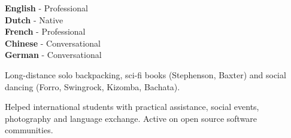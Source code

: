 \documentclass[9pt]{developercv} %
\begin{document}
\begin{minipage}[t]{0.3\textwidth}
	\vspace{-\baselineskip} %

	
	\textbf{English} - Professional\\
	\textbf{Dutch} - Native\\
	\textbf{French} - Professional\\
	\textbf{Chinese} - Conversational\\
	\textbf{German} - Conversational
\end{minipage}
\hfill
\begin{minipage}[t]{0.3\textwidth}
	\vspace{-\baselineskip} %
	
	
	Long-distance solo backpacking, sci-fi books (Stephenson, Baxter) and social dancing (Forro, Swingrock, Kizomba, Bachata).
\end{minipage}
\hfill
\begin{minipage}[t]{0.3\textwidth}
	\vspace{-\baselineskip} %
	
	
	Helped international students with practical assistance, social events, photography and language exchange. Active on open source software communities.
\end{minipage}

\end{document}

